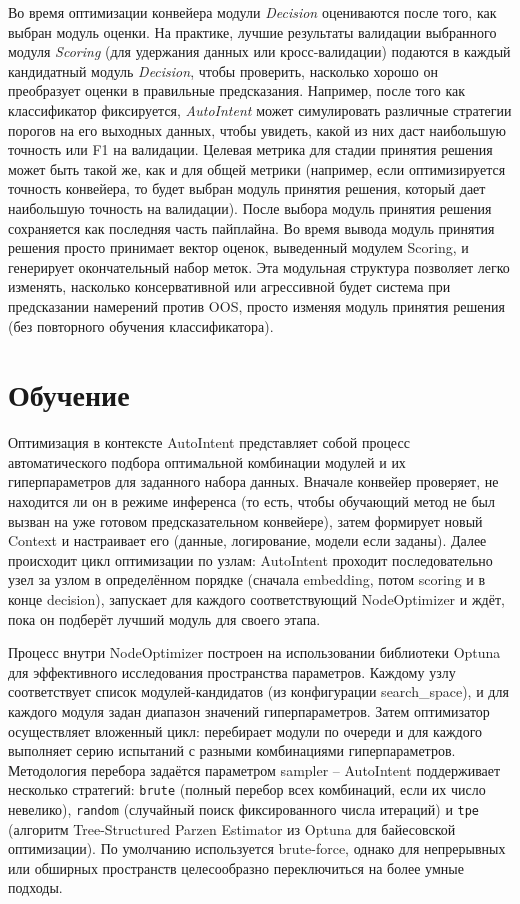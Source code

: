 \documentclass[14pt,a4paper,oneside,openany]{extbook}
\begin{document}
Во время оптимизации конвейера модули \emph{Decision} оцениваются после того, как выбран модуль оценки. На практике, лучшие результаты валидации выбранного модуля \emph{Scoring} (для удержания данных или кросс-валидации) подаются в каждый кандидатный модуль \emph{Decision}, чтобы проверить, насколько хорошо он преобразует оценки в правильные предсказания. Например, после того как классификатор фиксируется, \emph{AutoIntent} может симулировать различные стратегии порогов на его выходных данных, чтобы увидеть, какой из них даст наибольшую точность или F1 на валидации. Целевая метрика для стадии принятия решения может быть такой же, как и для общей метрики (например, если оптимизируется точность конвейера, то будет выбран модуль принятия решения, который дает наибольшую точность на валидации). После выбора модуль принятия решения сохраняется как последняя часть пайплайна. Во время вывода модуль принятия решения просто принимает вектор оценок, выведенный модулем Scoring, и генерирует окончательный набор меток. Эта модульная структура позволяет легко изменять, насколько консервативной или агрессивной будет система при предсказании намерений против OOS, просто изменяя модуль принятия решения (без повторного обучения классификатора).
\section{Обучение}
\label{sec:orgfd353d6}
Оптимизация в контексте AutoIntent представляет собой процесс автоматического подбора оптимальной комбинации модулей и их гиперпараметров для заданного набора данных. Вначале конвейер проверяет, не находится ли он в режиме инференса (то есть, чтобы обучающий метод не был вызван на уже готовом предсказательном конвейере), затем формирует новый Context и настраивает его (данные, логирование, модели если заданы). Далее происходит цикл оптимизации по узлам: AutoIntent проходит последовательно узел за узлом в определённом порядке (сначала embedding, потом scoring и в конце decision), запускает для каждого соответствующий NodeOptimizer и ждёт, пока он подберёт лучший модуль для своего этапа.

Процесс внутри NodeOptimizer построен на использовании библиотеки Optuna\autocite{akiba_optuna_2019a} для эффективного исследования пространства параметров. Каждому узлу соответствует список модулей-кандидатов (из конфигурации search\_space), и для каждого модуля задан диапазон значений гиперпараметров. Затем оптимизатор осуществляет вложенный цикл: перебирает модули по очереди и для каждого выполняет серию испытаний с разными комбинациями гиперпараметров. Методология перебора задаётся параметром sampler – AutoIntent поддерживает несколько стратегий: \texttt{brute} (полный перебор всех комбинаций, если их число невелико), \texttt{random} (случайный поиск фиксированного числа итераций) и \texttt{tpe} (алгоритм Tree-Structured Parzen Estimator из Optuna для байесовской оптимизации). По умолчанию используется brute-force, однако для непрерывных или обширных пространств целесообразно переключиться на более умные подходы.
\end{document}

